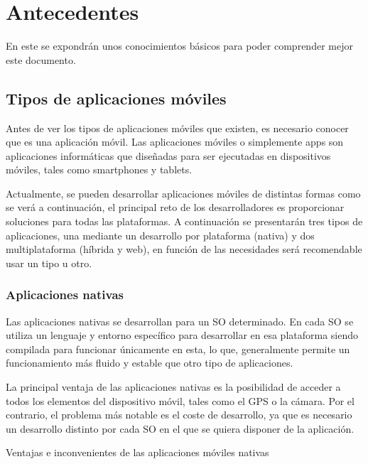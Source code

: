 \chapter{Antecedentes}
\label{chap:antecedentes}

En este se expondrán unos conocimientos básicos para poder comprender mejor este documento.

\section{Tipos de aplicaciones móviles}

Antes de ver los tipos de aplicaciones móviles que existen, es necesario conocer que es una aplicación móvil. Las aplicaciones
móviles o simplemente apps son aplicaciones informáticas que diseñadas para ser ejecutadas en dispositivos móviles, tales 
como smartphones y tablets.

Actualmente, se pueden desarrollar aplicaciones móviles de distintas formas \cite{ANADES} como se verá a continuación, el 
principal reto de los desarrolladores es proporcionar soluciones para todas las plataformas.  A continuación se presentarán 
tres tipos de aplicaciones, una mediante un desarrollo por plataforma (nativa) y dos multiplataforma (híbrida y web), en 
función de las necesidades será recomendable usar un tipo u otro.

\subsection{Aplicaciones nativas}

Las aplicaciones nativas se desarrollan para un \acf{SO} determinado. En cada \acs{SO} se utiliza un lenguaje y entorno 
específico para desarrollar en esa plataforma siendo compilada para funcionar únicamente en esta, lo que, generalmente 
permite un funcionamiento más fluido y estable que otro tipo de aplicaciones.

La principal ventaja de las aplicaciones nativas es la posibilidad de acceder a todos los elementos del dispositivo móvil, tales
como el GPS o la cámara. Por el contrario, el problema más notable es el coste de desarrollo, ya que es necesario
un desarrollo distinto por cada \acs{SO} en el que se quiera disponer de la aplicación.

\begin{table}[nativas]
	\centering
	{\small
		
	}
	\caption[Ventajas e inconvenientes de las aplicaciones móviles nativas]
	{Ventajas e inconvenientes de las aplicaciones móviles nativas~\cite{TIPAPP}}
	\label{tab:nativas}
\end{table}

